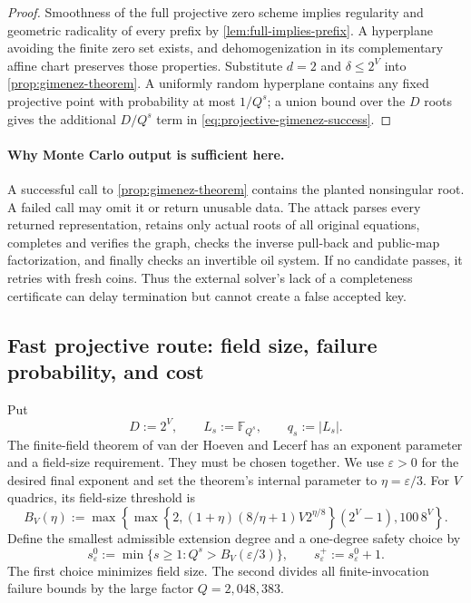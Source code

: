 \documentclass[11pt,a4paper]{article}
\theoremstyle{definition}
\theoremstyle{remark}
\newcommand{\F}{\mathbb F}
\begin{document}
\begin{proof}
Smoothness of the full projective zero scheme implies regularity and geometric radicality of every prefix by \cref{lem:full-implies-prefix}.  A hyperplane avoiding the finite zero set exists, and dehomogenization in its complementary affine chart preserves those properties.  Substitute $d=2$ and $\delta\le2^V$ into \cref{prop:gimenez-theorem}.  A uniformly random hyperplane contains any fixed projective point with probability at most $1/Q^s$; a union bound over the $D$ roots gives the additional $D/Q^s$ term in \eqref{eq:projective-gimenez-success}.
\end{proof}

\paragraph{Why Monte Carlo output is sufficient here.}
A successful call to \cref{prop:gimenez-theorem} contains the planted nonsingular root.  A failed call may omit it or return unusable data.  The attack parses every returned representation, retains only actual roots of all original equations, completes and verifies the graph, checks the inverse pull-back and public-map factorization, and finally checks an invertible oil system.  If no candidate passes, it retries with fresh coins.  Thus the external solver's lack of a completeness certificate can delay termination but cannot create a false accepted key.

\subsection{Fast projective route: field size, failure probability, and cost}\label{subsec:field}

Put
\[
 D:=2^V,\qquad L_s:=\F_{Q^s},\qquad q_s:=|L_s|.
\]
The finite-field theorem of van der Hoeven and Lecerf has an exponent parameter and a field-size requirement.  They must be chosen together.  We use $\varepsilon>0$ for the desired final exponent and set the theorem's internal parameter to $\eta=\varepsilon/3$.  For $V$ quadrics, its field-size threshold is
\begin{equation}\label{eq:vdhl-field-bound}
 B_V(\eta):=
 \max\!\left\{
 \max\!\left\{2,(1+\eta)(8/\eta+1)V2^{\eta/8}\right\}(2^V-1),
 100\,8^V
 \right\}.
\end{equation}
Define the smallest admissible extension degree and a one-degree safety choice by
\begin{equation}\label{eq:solver-extension-degree}
 s_\varepsilon^0:=\min\{s\ge1:Q^s>B_V(\varepsilon/3)\},
 \qquad
 s_\varepsilon^+:=s_\varepsilon^0+1.
\end{equation}
The first choice minimizes field size.  The second divides all finite-invocation failure bounds by the large factor $Q=2{,}048{,}383$.
\end{document}
